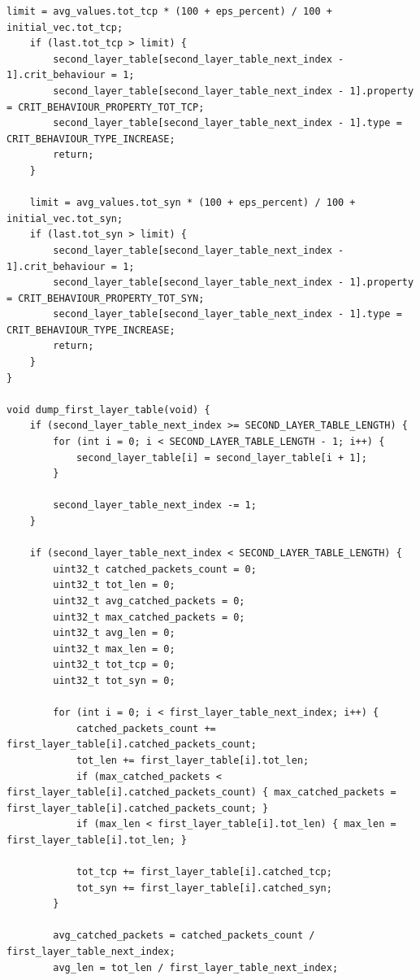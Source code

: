 \documentclass{bmstu}
\begin{document}
\begin{lstlisting}[caption = {core\_module.c}]
    limit = avg_values.tot_tcp * (100 + eps_percent) / 100 + initial_vec.tot_tcp;
    if (last.tot_tcp > limit) {
        second_layer_table[second_layer_table_next_index - 1].crit_behaviour = 1;
        second_layer_table[second_layer_table_next_index - 1].property = CRIT_BEHAVIOUR_PROPERTY_TOT_TCP;
        second_layer_table[second_layer_table_next_index - 1].type = CRIT_BEHAVIOUR_TYPE_INCREASE;
        return;
    }

    limit = avg_values.tot_syn * (100 + eps_percent) / 100 + initial_vec.tot_syn;
    if (last.tot_syn > limit) {
        second_layer_table[second_layer_table_next_index - 1].crit_behaviour = 1;
        second_layer_table[second_layer_table_next_index - 1].property = CRIT_BEHAVIOUR_PROPERTY_TOT_SYN;
        second_layer_table[second_layer_table_next_index - 1].type = CRIT_BEHAVIOUR_TYPE_INCREASE;
        return;
    }
}

void dump_first_layer_table(void) {
    if (second_layer_table_next_index >= SECOND_LAYER_TABLE_LENGTH) {
        for (int i = 0; i < SECOND_LAYER_TABLE_LENGTH - 1; i++) {
            second_layer_table[i] = second_layer_table[i + 1];
        }

        second_layer_table_next_index -= 1;
    }

    if (second_layer_table_next_index < SECOND_LAYER_TABLE_LENGTH) {
        uint32_t catched_packets_count = 0;
        uint32_t tot_len = 0;
        uint32_t avg_catched_packets = 0;
        uint32_t max_catched_packets = 0;
        uint32_t avg_len = 0;
        uint32_t max_len = 0;
        uint32_t tot_tcp = 0;
        uint32_t tot_syn = 0;

        for (int i = 0; i < first_layer_table_next_index; i++) {
            catched_packets_count += first_layer_table[i].catched_packets_count;
            tot_len += first_layer_table[i].tot_len;
            if (max_catched_packets < first_layer_table[i].catched_packets_count) { max_catched_packets = first_layer_table[i].catched_packets_count; }
            if (max_len < first_layer_table[i].tot_len) { max_len = first_layer_table[i].tot_len; }

            tot_tcp += first_layer_table[i].catched_tcp;
            tot_syn += first_layer_table[i].catched_syn;
        }

        avg_catched_packets = catched_packets_count / first_layer_table_next_index;
        avg_len = tot_len / first_layer_table_next_index;


\end{lstlisting}
\end{document}
